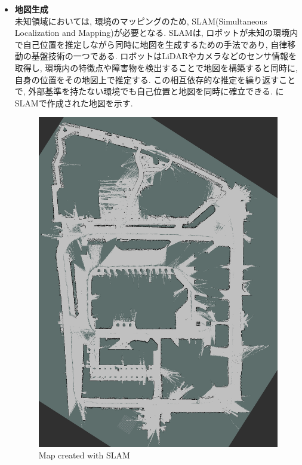 \begin{itemize}
     \item \textbf{地図生成}\\
     未知領域においては, 環境のマッピングのため, SLAM(Simultaneous Localization and Mapping)が必要となる. 
     SLAMは, ロボットが未知の環境内で自己位置を推定しながら同時に地図を生成するための手法であり, 
     自律移動の基盤技術の一つである. ロボットはLiDARやカメラなどのセンサ情報を取得し, 環境内の特徴点や障害物を検出することで地図を構築すると同時に, 
     自身の位置をその地図上で推定する. この相互依存的な推定を繰り返すことで, 外部基準を持たない環境でも自己位置と地図を同時に確立できる. 
     にSLAMで作成された地図を示す. 
     \begin{figure}[hbtp]
     \centering
          \includegraphics[keepaspectratio, scale=0.2]
           {images/slam_toolbox.png}
          \caption{Map created with SLAM}
          \label{Fig:Map}
     \end{figure}


\end{itemize}
